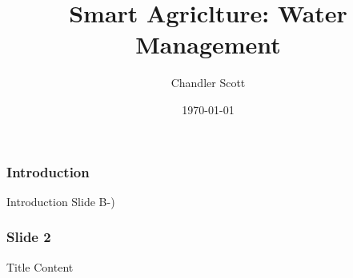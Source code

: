 \documentclass{beamer}
\title{Smart Agriclture: Water Management}
\author{Chandler Scott}
\date{\today}
\begin{document}
\frame{\titlepage}

\begin{frame}
    \frametitle{Introduction}
    Introduction Slide B-)
\end{frame}

\begin{frame}
    \frametitle{Slide 2}
     Title Content
\end{frame}
\end{document}
